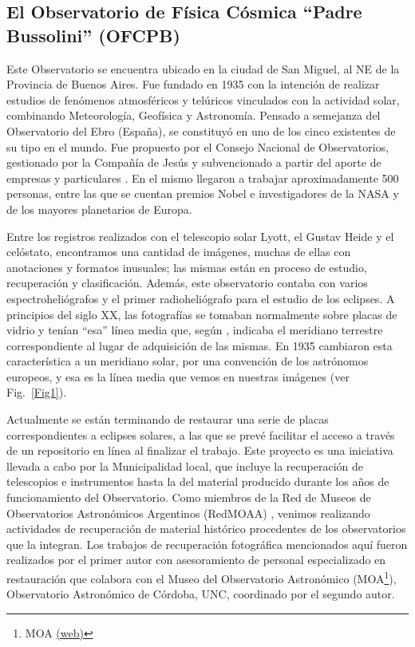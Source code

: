 \documentclass[baaa]{baaa}
\begin{document}
\subsection{El Observatorio de Física Cósmica ``Padre Bussolini'' (OFCPB)}\label{intro_b}
Este Observatorio se encuentra ubicado en la ciudad de San Miguel, al NE de la Provincia de Buenos Aires. Fue fundado en 1935 con la intención de realizar estudios de fenómenos atmosféricos 
y telúricos vinculados con la actividad solar, combinando Meteorología, Geofísica y Astronomía. Pensado a semejanza del Observatorio del Ebro (España), se constituyó en uno de los cinco existentes de su tipo en el mundo. Fue propuesto por el Consejo Nacional de Observatorios, gestionado por la Compañía de Jesús y subvencionado a partir del aporte de empresas y particulares \citep{Paolantonio2015}. 
En el mismo llegaron a trabajar aproximadamente 500 personas, entre las que se cuentan premios Nobel  e investigadores de la NASA y de los mayores planetarios de Europa.

Entre los registros realizados con el telescopio solar Lyott, el Gustav Heide y el celóstato, encontramos una cantidad de imágenes, muchas de ellas
con anotaciones y formatos inusuales; las mismas están en proceso de estudio, recuperación y clasificación. Además, este observatorio contaba con 
varios espectroheliógrafos y el primer radioheliógrafo para el estudio de los eclipses.
A principios del siglo XX, las fotografías se tomaban normalmente sobre placas de vidrio y tenían ``esa'' línea media que, según \citet{Iwa2020}, indicaba el meridiano terrestre correspondiente al lugar de adquisición de las mismas.
En 1935 cambiaron esta característica a un meridiano solar, por una convención de los astrónomos europeos, y esa es la línea media que vemos en nuestras imágenes (ver Fig.~\ref{Fig1}).

Actualmente se están terminando de restaurar una serie de placas correspondientes a eclipses solares, a las que se prevé facilitar el acceso a través de un repositorio en línea al finalizar el trabajo.
Este proyecto es una iniciativa llevada a cabo por la Municipalidad local, que incluye la recuperación de telescopios e instrumentos hasta la del material producido durante los años 
de funcionamiento del Observatorio.
Como miembros de la Red de Museos de Observatorios Astronómicos Argentinos (RedMOAA) \citep{2023BAAA...64..323M},
venimos realizando actividades de recuperación de material histórico procedentes de los observatorios que la integran. Los trabajos de recuperación fotográfica mencionados aquí fueron realizados por el primer autor con asesoramiento de personal especializado en restauración que colabora con el
Museo del Observatorio Astronómico (MOA\footnote{MOA \href{https://moa.unc.edu.ar}{(web)}}), Observatorio Astronómico de Córdoba, UNC, coordinado por el segundo autor.
\end{document}
